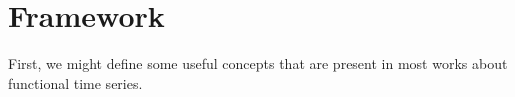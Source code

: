 \documentclass[
	12pt,				%
	oneside,			%
	a4paper,			%
	english,			%
	brazil				%
	]{abntex2ppgsi}
\begin{document}
    









\chapter{Framework}

First, we might define some useful concepts that are present in most works about functional time series. 
\end{document}
